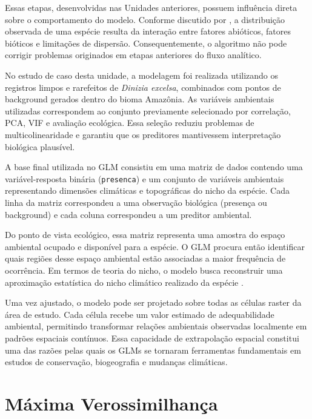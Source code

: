 Essas etapas, desenvolvidas nas Unidades anteriores, possuem influência direta sobre o comportamento do modelo. Conforme discutido por \citet{soberon2007grinnellian}, a distribuição observada de uma espécie resulta da interação entre fatores abióticos, fatores bióticos e limitações de dispersão. Consequentemente, o algoritmo não pode corrigir problemas originados em etapas anteriores do fluxo analítico.

No estudo de caso desta unidade, a modelagem foi realizada utilizando os registros limpos e rarefeitos de \textit{Dinizia excelsa}, combinados com pontos de background gerados dentro do bioma Amazônia. As variáveis ambientais utilizadas correspondem ao conjunto previamente selecionado por correlação, PCA, VIF e avaliação ecológica. Essa seleção reduziu problemas de multicolinearidade e garantiu que os preditores mantivessem interpretação biológica plausível.

A base final utilizada no GLM consistiu em uma matriz de dados contendo uma variável-resposta binária (\texttt{presenca}) e um conjunto de variáveis ambientais representando dimensões climáticas e topográficas do nicho da espécie. Cada linha da matriz correspondeu a uma observação biológica (presença ou background) e cada coluna correspondeu a um preditor ambiental.

Do ponto de vista ecológico, essa matriz representa uma amostra do espaço ambiental ocupado e disponível para a espécie. O GLM procura então identificar quais regiões desse espaço ambiental estão associadas a maior frequência de ocorrência. Em termos de teoria do nicho, o modelo busca reconstruir uma aproximação estatística do nicho climático realizado da espécie \citep{peterson2011ecological,elith2009species}.

Uma vez ajustado, o modelo pode ser projetado sobre todas as células raster da área de estudo. Cada célula recebe um valor estimado de adequabilidade ambiental, permitindo transformar relações ambientais observadas localmente em padrões espaciais contínuos. Essa capacidade de extrapolação espacial constitui uma das razões pelas quais os GLMs se tornaram ferramentas fundamentais em estudos de conservação, biogeografia e mudanças climáticas.


\section{Máxima Verossimilhança}

